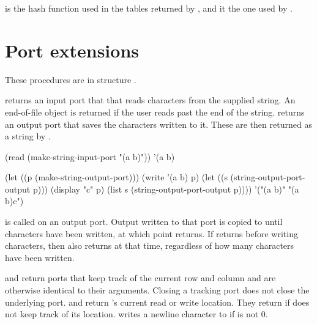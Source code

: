 \begin{protos}
\end{protos}
\noindent
{} is the hash function used in the tables
 returned by , and  it the one used
 by .

\section{Port extensions}

These procedures are in structure .

\begin{protos}
\end{protos}
\noindent {} returns an input port that
 that reads characters from the supplied string.  An end-of-file
 object is returned if the user reads past the end of the string.
 returns an output port that saves
 the characters written to it.
These are then returned as a string by .

\begin{example}
(read (make-string-input-port "(a b)"))
    \evalsto '(a b)

(let ((p (make-string-output-port)))
  (write '(a b) p)
  (let ((s (string-output-port-output p)))
    (display "c" p)
    (list s (string-output-port-output p))))
    \evalsto '("(a b)" "(a b)c")
\end{example}

\begin{protos}
\end{protos}
\noindent
{} is called on an output port.
Output written to that port is copied to  until 
 characters have been written, at which point  returns.
If  returns before writing  characters, then
  also returns at that time, regardless of how many
 characters have been written.

\begin{protos}
\end{protos}
\noindent {} and 
 return ports that keep track of the current row and column and
 are otherwise identical to their arguments.
Closing a tracking port does not close the underlying port.
 and  return
  's current read or write location.
They return  if  does not keep track of its location.
 writes a newline character to  if
  is not 0.

